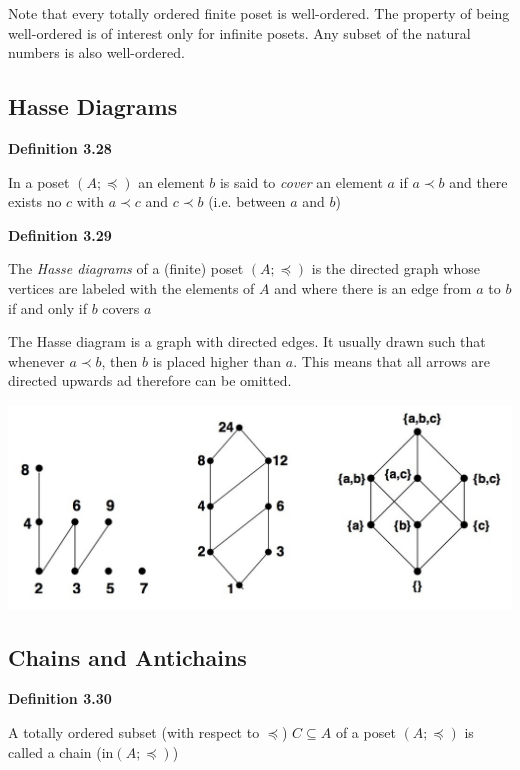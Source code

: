 \documentclass[a4paper]{report}
\newenvironment{definition}[1]{\begin{framed}\centerline{\textbf{Definition #1}}\noindent\hspace{-1.1mm}}{\end{framed}}
\begin{document}
Note that every totally ordered finite poset is well-ordered. The property of being well-ordered is of interest only for infinite posets. Any subset of the natural numbers is also well-ordered. 

\subsection{Hasse Diagrams}
\begin{definition}{3.28}
In a poset $(A;\preceq)$ an element $b$ is said to \emph{cover} an element $a$ if $a\prec b$ and there exists no $c$ with $a\prec c$ and $c\prec b$ (i.e. between $a$ and $b$)
\end{definition}

\begin{definition}{3.29}
The \emph{Hasse diagrams} of a (finite) poset $(A;\preceq)$ is the directed graph whose vertices are labeled with the elements of $A$ and where there is an edge from $a$ to $b$ if and only if $b$ covers $a$
\end{definition}

The Hasse diagram is a graph with directed edges. It usually drawn such that whenever $a\prec b$, then $b$ is placed higher than $a$. This means that all arrows are directed upwards ad therefore can be omitted.

\begin{center}
\includegraphics[scale=0.27]{Figures/Figure3,1Page48.jpg}
\end{center}

\subsection{Chains and Antichains}
\begin{definition}{3.30}
A totally ordered subset (with respect to $\preceq$) $C\subseteq A$ of a poset $(A;\preceq)$ is called a chain (in$(A;\preceq)$)
\end{definition}
\end{document}

